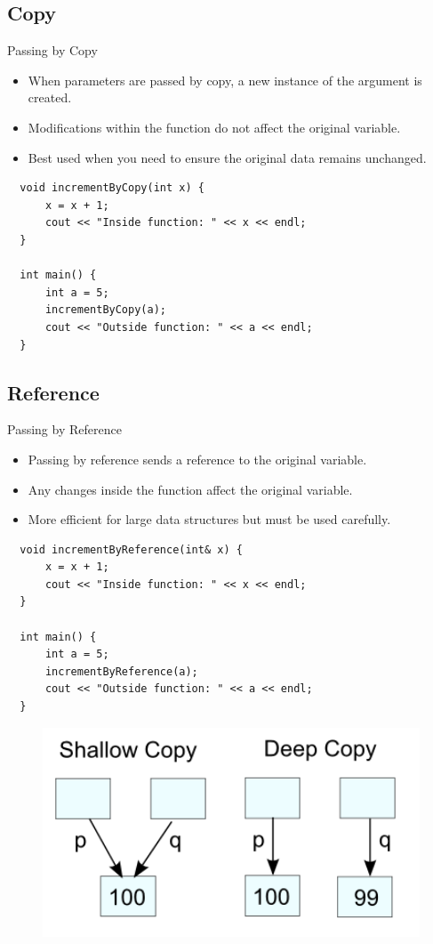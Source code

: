 \documentclass[10pt]{beamer}
\begin{document}
\subsection{Copy}
\begin{frame}[fragile]{Passing by Copy}
  \begin{itemize}
    \item When parameters are passed by copy, a new instance of the argument is created.
    \item Modifications within the function do not affect the original variable.
    \item Best used when you need to ensure the original data remains unchanged.
\end{itemize}

\begin{lstlisting}
  void incrementByCopy(int x) {
      x = x + 1;
      cout << "Inside function: " << x << endl;
  }
  
  int main() {
      int a = 5;
      incrementByCopy(a);
      cout << "Outside function: " << a << endl;
  }
  \end{lstlisting}

\end{frame}

\subsection{Reference}

\begin{frame}[fragile]{Passing by Reference}
  \begin{itemize}
    \item Passing by reference sends a reference to the original variable.
    \item Any changes inside the function affect the original variable.
    \item More efficient for large data structures but must be used carefully.
  \end{itemize}
  
  \begin{lstlisting}
  void incrementByReference(int& x) {
      x = x + 1;
      cout << "Inside function: " << x << endl;
  }
  
  int main() {
      int a = 5;
      incrementByReference(a);
      cout << "Outside function: " << a << endl;
  }
  \end{lstlisting}
\end{frame}

\begin{frame}
  \begin{figure}[h]
    \centering
    \includegraphics[width=1.0\textwidth]{figures/deep_vs_shallow_copy.png}
    \label{fig:MemoryHerarchy}
  \end{figure}
\end{frame}
\end{document}
